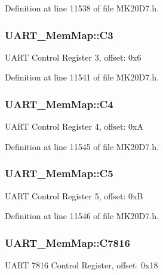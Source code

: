 Definition at line 11538 of file M\+K20\+D7.\+h.

\subsubsection[{\texorpdfstring{C3}{C3}}]{ U\+A\+R\+T\+\_\+\+Mem\+Map\+::\+C3}\hypertarget{struct_u_a_r_t___mem_map_a2e3cebfbfb9d96766397a8a102b8c29c}{}\label{struct_u_a_r_t___mem_map_a2e3cebfbfb9d96766397a8a102b8c29c}
U\+A\+RT Control Register 3, offset\+: 0x6 

Definition at line 11541 of file M\+K20\+D7.\+h.

\subsubsection[{\texorpdfstring{C4}{C4}}]{ U\+A\+R\+T\+\_\+\+Mem\+Map\+::\+C4}\hypertarget{struct_u_a_r_t___mem_map_a6f18d698404d3f130cab66610aa526de}{}\label{struct_u_a_r_t___mem_map_a6f18d698404d3f130cab66610aa526de}
U\+A\+RT Control Register 4, offset\+: 0xA 

Definition at line 11545 of file M\+K20\+D7.\+h.

\subsubsection[{\texorpdfstring{C5}{C5}}]{ U\+A\+R\+T\+\_\+\+Mem\+Map\+::\+C5}\hypertarget{struct_u_a_r_t___mem_map_a1d9838b1b1a99857168954f51bc0802e}{}\label{struct_u_a_r_t___mem_map_a1d9838b1b1a99857168954f51bc0802e}
U\+A\+RT Control Register 5, offset\+: 0xB 

Definition at line 11546 of file M\+K20\+D7.\+h.

\subsubsection[{\texorpdfstring{C7816}{C7816}}]{ U\+A\+R\+T\+\_\+\+Mem\+Map\+::\+C7816}\hypertarget{struct_u_a_r_t___mem_map_a8c98b0dd2335e137c509ba63636f5089}{}\label{struct_u_a_r_t___mem_map_a8c98b0dd2335e137c509ba63636f5089}
U\+A\+RT 7816 Control Register, offset\+: 0x18 

